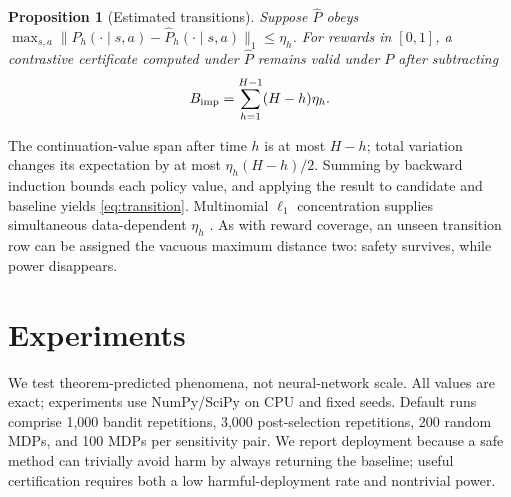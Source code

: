 \documentclass[letterpaper]{article}
\newtheorem{proposition}[theorem]{Proposition}
\theoremstyle{remark}
\begin{document}
\begin{proposition}[Estimated transitions]\label{prop:transition}
Suppose $\widehat P$ obeys
$\max_{s,a}\|P_h(\cdot\mid s,a)-\widehat P_h(\cdot\mid s,a)\|_1\leq\eta_h$.
For rewards in $[0,1]$, a contrastive certificate computed under $\widehat P$ remains valid under $P$ after subtracting
\begin{equation}
B_{\rm imp}=\sum_{h=1}^{H-1}(H-h)\eta_h. \label{eq:transition}
\end{equation}
\end{proposition}
The continuation-value span after time $h$ is at most $H-h$; total variation changes its expectation by at most $\eta_h(H-h)/2$. Summing by backward induction bounds each policy value, and applying the result to candidate and baseline yields \eqref{eq:transition}. Multinomial $\ell_1$ concentration supplies simultaneous data-dependent $\eta_h$ \citep{weissman2003inequalities}. As with reward coverage, an unseen transition row can be assigned the vacuous maximum distance two: safety survives, while power disappears.

\section{Experiments}
We test theorem-predicted phenomena, not neural-network scale. All values are exact; experiments use NumPy/SciPy on CPU and fixed seeds. Default runs comprise 1,000 bandit repetitions, 3,000 post-selection repetitions, 200 random MDPs, and 100 MDPs per sensitivity pair. We report deployment because a safe method can trivially avoid harm by always returning the baseline; useful certification requires both a low harmful-deployment rate and nontrivial power.
\end{document}
